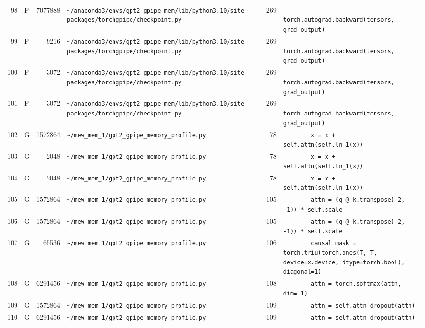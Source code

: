 \documentclass{article}
\begin{document}
\begin{longtable}{r l r p{6.5cm} r p{7.0cm}}
98 & F & 7077888 & \lstinline|~/anaconda3/envs/gpt2_gpipe_mem/lib/python3.10/site-packages/torchgpipe/checkpoint.py| & 269 & \lstinline|            torch.autograd.backward(tensors, grad_output)| \\
99 & F & 9216 & \lstinline|~/anaconda3/envs/gpt2_gpipe_mem/lib/python3.10/site-packages/torchgpipe/checkpoint.py| & 269 & \lstinline|            torch.autograd.backward(tensors, grad_output)| \\
100 & F & 3072 & \lstinline|~/anaconda3/envs/gpt2_gpipe_mem/lib/python3.10/site-packages/torchgpipe/checkpoint.py| & 269 & \lstinline|            torch.autograd.backward(tensors, grad_output)| \\
101 & F & 3072 & \lstinline|~/anaconda3/envs/gpt2_gpipe_mem/lib/python3.10/site-packages/torchgpipe/checkpoint.py| & 269 & \lstinline|            torch.autograd.backward(tensors, grad_output)| \\
102 & G & 1572864 & \lstinline|~/mew_mem_1/gpt2_gpipe_memory_profile.py| & 78 & \lstinline|        x = x + self.attn(self.ln_1(x))| \\
103 & G & 2048 & \lstinline|~/mew_mem_1/gpt2_gpipe_memory_profile.py| & 78 & \lstinline|        x = x + self.attn(self.ln_1(x))| \\
104 & G & 2048 & \lstinline|~/mew_mem_1/gpt2_gpipe_memory_profile.py| & 78 & \lstinline|        x = x + self.attn(self.ln_1(x))| \\
105 & G & 1572864 & \lstinline|~/mew_mem_1/gpt2_gpipe_memory_profile.py| & 105 & \lstinline|        attn = (q @ k.transpose(-2, -1)) * self.scale| \\
106 & G & 1572864 & \lstinline|~/mew_mem_1/gpt2_gpipe_memory_profile.py| & 105 & \lstinline|        attn = (q @ k.transpose(-2, -1)) * self.scale| \\
107 & G & 65536 & \lstinline|~/mew_mem_1/gpt2_gpipe_memory_profile.py| & 106 & \lstinline|        causal_mask = torch.triu(torch.ones(T, T, device=x.device, dtype=torch.bool), diagonal=1)| \\
108 & G & 6291456 & \lstinline|~/mew_mem_1/gpt2_gpipe_memory_profile.py| & 108 & \lstinline|        attn = torch.softmax(attn, dim=-1)| \\
109 & G & 1572864 & \lstinline|~/mew_mem_1/gpt2_gpipe_memory_profile.py| & 109 & \lstinline|        attn = self.attn_dropout(attn)| \\
110 & G & 6291456 & \lstinline|~/mew_mem_1/gpt2_gpipe_memory_profile.py| & 109 & \lstinline|        attn = self.attn_dropout(attn)| \\

\end{longtable}
\end{document}
